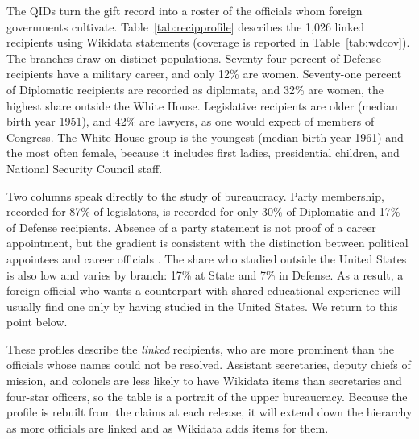 \documentclass[11pt]{article}
\makeatletter
\renewcommand\section{\@startsection{section}{1}{\z@}{-3.0ex plus -1ex minus -.2ex}{1.5ex plus .2ex}{\normalfont\large\bfseries\MakeUppercase}}
\makeatother
\begin{document}
The QIDs turn the gift record into a roster of the officials whom foreign governments cultivate. Table~\ref{tab:recipprofile} describes the 1,026 linked recipients using Wikidata statements (coverage is reported in Table~\ref{tab:wdcov}). The branches draw on distinct populations. Seventy-four percent of Defense recipients have a military career, and only 12\% are women. Seventy-one percent of Diplomatic recipients are recorded as diplomats, and 32\% are women, the highest share outside the White House. Legislative recipients are older (median birth year 1951), and 42\% are lawyers, as one would expect of members of Congress. The White House group is the youngest (median birth year 1961) and the most often female, because it includes first ladies, presidential children, and National Security Council staff.

Two columns speak directly to the study of bureaucracy. Party membership, recorded for 87\% of legislators, is recorded for only 30\% of Diplomatic and 17\% of Defense recipients. Absence of a party statement is not proof of a career appointment, but the gradient is consistent with the distinction between political appointees and career officials \citep{lewis2008politics}. The share who studied outside the United States is also low and varies by branch: 17\% at State and 7\% in Defense. As a result, a foreign official who wants a counterpart with shared educational experience will usually find one only by having studied in the United States. We return to this point below.

These profiles describe the \emph{linked} recipients, who are more prominent than the officials whose names could not be resolved. Assistant secretaries, deputy chiefs of mission, and colonels are less likely to have Wikidata items than secretaries and four-star officers, so the table is a portrait of the upper bureaucracy. Because the profile is rebuilt from the claims at each release, it will extend down the hierarchy as more officials are linked and as Wikidata adds items for them.

\section{What Do Givers and Recipients Share?}\label{sec:shared}

\begin{table}[t]
\centering\footnotesize\setlength{\tabcolsep}{4pt}
\caption{Characteristics shared by the giver and the recipient of each gift, compared with random pairings. The unit is a gift whose giver and recipient both have QIDs. ``Gifts'' counts those for which the characteristic is recorded for both people. The two baselines shuffle givers among gifts reported in the same year, or in the same branch and year, and average 500 permutations. ``Ratio'' is observed over the branch-year baseline. $p$ is the share of branch-year permutations at least as large as the observed value. ``Professional career'' groups occupations into military, diplomat, law, economics/business, academic, and civil servant (``politician'' is excluded). Panel B drops gifts reported by the White House and Congress.}\label{tab:shared}

\end{table}
\end{document}
